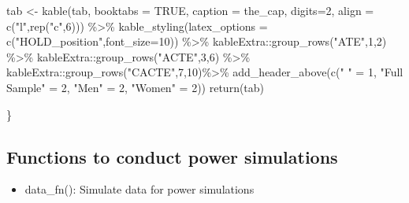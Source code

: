 \documentclass[
]{article}
\newenvironment{Shaded}{\begin{snugshade}}{\end{snugshade}}
\newcommand{\AttributeTok}[1]{\textcolor[rgb]{0.77,0.63,0.00}{#1}}
\newcommand{\ConstantTok}[1]{\textcolor[rgb]{0.00,0.00,0.00}{#1}}
\newcommand{\DecValTok}[1]{\textcolor[rgb]{0.00,0.00,0.81}{#1}}
\newcommand{\FunctionTok}[1]{\textcolor[rgb]{0.00,0.00,0.00}{#1}}
\newcommand{\NormalTok}[1]{#1}
\newcommand{\OtherTok}[1]{\textcolor[rgb]{0.56,0.35,0.01}{#1}}
\newcommand{\SpecialCharTok}[1]{\textcolor[rgb]{0.00,0.00,0.00}{#1}}
\newcommand{\StringTok}[1]{\textcolor[rgb]{0.31,0.60,0.02}{#1}}
\providecommand{\tightlist}{%
  \setlength{\itemsep}{0pt}\setlength{\parskip}{0pt}}
\begin{document}
\begin{Shaded}
\begin{Highlighting}[]
\NormalTok{  tab }\OtherTok{\textless{}{-}} \FunctionTok{kable}\NormalTok{(tab,}
               \AttributeTok{booktabs =} \ConstantTok{TRUE}\NormalTok{, }
               \AttributeTok{caption =}\NormalTok{ the\_cap, }
               \AttributeTok{digits=}\DecValTok{2}\NormalTok{,}
               \AttributeTok{align =} \FunctionTok{c}\NormalTok{(}\StringTok{"l"}\NormalTok{,}\FunctionTok{rep}\NormalTok{(}\StringTok{"c"}\NormalTok{,}\DecValTok{6}\NormalTok{))) }\SpecialCharTok{\%\textgreater{}\%} 
    \FunctionTok{kable\_styling}\NormalTok{(}\AttributeTok{latex\_options =} \FunctionTok{c}\NormalTok{(}\StringTok{"HOLD\_position"}\NormalTok{,}\AttributeTok{font\_size=}\DecValTok{10}\NormalTok{)) }\SpecialCharTok{\%\textgreater{}\%}
\NormalTok{    kableExtra}\SpecialCharTok{::}\FunctionTok{group\_rows}\NormalTok{(}\StringTok{"ATE"}\NormalTok{,}\DecValTok{1}\NormalTok{,}\DecValTok{2}\NormalTok{) }\SpecialCharTok{\%\textgreater{}\%}
\NormalTok{    kableExtra}\SpecialCharTok{::}\FunctionTok{group\_rows}\NormalTok{(}\StringTok{"ACTE"}\NormalTok{,}\DecValTok{3}\NormalTok{,}\DecValTok{6}\NormalTok{) }\SpecialCharTok{\%\textgreater{}\%}
\NormalTok{    kableExtra}\SpecialCharTok{::}\FunctionTok{group\_rows}\NormalTok{(}\StringTok{"CACTE"}\NormalTok{,}\DecValTok{7}\NormalTok{,}\DecValTok{10}\NormalTok{)}\SpecialCharTok{\%\textgreater{}\%}
    \FunctionTok{add\_header\_above}\NormalTok{(}\FunctionTok{c}\NormalTok{(}\StringTok{" "} \OtherTok{=} \DecValTok{1}\NormalTok{, }\StringTok{"Full Sample"} \OtherTok{=} \DecValTok{2}\NormalTok{, }\StringTok{"Men"} \OtherTok{=} \DecValTok{2}\NormalTok{, }\StringTok{"Women"} \OtherTok{=} \DecValTok{2}\NormalTok{))}
  \FunctionTok{return}\NormalTok{(tab)}
  
\NormalTok{\}}
\end{Highlighting}
\end{Shaded}

\hypertarget{functions-to-conduct-power-simulations}{%
\subsection{Functions to conduct power
simulations}\label{functions-to-conduct-power-simulations}}

\begin{itemize}
\tightlist
\item
  data\_fn(): Simulate data for power simulations
\end{itemize}
\end{document}
